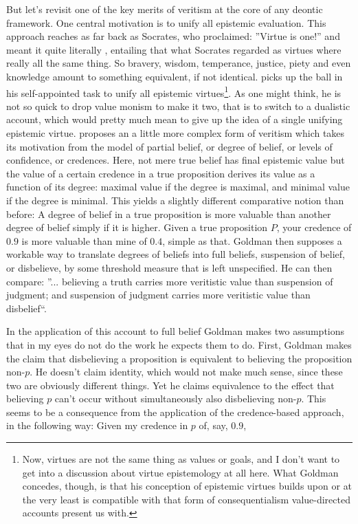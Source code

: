 \documentclass[12pt,numbers=noenddot]{scrartcl}
\begin{document}
But let's revisit one of the key merits of veritism at the core of any deontic framework. One central motivation is to unify all epistemic evaluation. This approach reaches as far back as Socrates, who proclaimed: ”Virtue is one!” and meant it quite literally \parencite{penner1973}, entailing that what Socrates regarded as virtues where really all the same thing. So bravery, wisdom, temperance, justice, piety and even knowledge amount to something equivalent, if not identical.
\textcite{Goldman2002-GOLTUO-2} picks up the ball in his self-appointed task to unify all epistemic virtues\footnote{Now, virtues are not the same thing as values or goals, and I don't want to get into a discussion about virtue epistemology at all here. What Goldman concedes, though, is that his conception of epistemic virtues builds upon or at the very least is compatible with that form of consequentialism value-directed accounts present us with.}. As one might think, he is not so quick to drop value monism to make it two, that is to switch to a dualistic account, which would pretty much mean to give up the idea of a single unifying epistemic virtue. 
\textcite[58]{Goldman2002-GOLTUO-2} proposes an a little more complex form of veritism which takes its motivation from the model of partial belief, or degree of belief, or levels of confidence, or credences. Here, not mere true belief has final epistemic value but the value of a certain credence in a true proposition derives its value as a function of its degree: maximal value if the degree is maximal, and minimal value if the degree is minimal. This yields a slightly different comparative notion than before: A degree of belief in a true proposition is more valuable than another degree of belief simply if it is higher. Given a true proposition $P$, your credence of $0.9$ is more valuable than mine of $0.4$, simple as that.
Goldman then supposes a workable way to translate degrees of beliefs into full beliefs, suspension of belief, or disbelieve, by some threshold measure that is left unspecified. He can then compare: ”... believing a truth carries more veritistic value than suspension of judgment; and suspension of judgment carries more veritistic value than disbelief“.


In the application of this account to full belief Goldman makes two assumptions that in my eyes do not do the work he expects them to do. First, Goldman makes the claim that disbelieving a proposition is equivalent to believing the proposition non-$p$. He doesn't claim identity, which would not make much sense, since these two are obviously different things. Yet he claims equivalence to the effect that believing $p$ can't occur without simultaneously also disbelieving non-$p$. This seems to be a consequence from the application of the credence-based approach, in the following way: Given my credence in $p$ of, say, $0.9$, 
\end{document}
